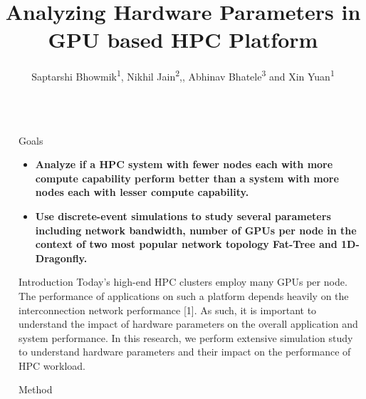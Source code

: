 \documentclass[final]{beamer}
\title{
  {Analyzing Hardware Parameters in GPU based HPC Platform}}
\author{Saptarshi Bhowmik\textsuperscript{1}, Nikhil Jain\textsuperscript{2},, Abhinav Bhatele\textsuperscript{3} and Xin Yuan\textsuperscript{1}} %
\institute{1. Florida State University, 2. NVIDIA, Inc, 3. University of Maryland}
\newlength{\sepwidth}
\newcommand{\separatorcolumn}{\begin{column}{\sepwidth}\end{column}}
\begin{document}
\begin{frame}[t]
\begin{columns}[t]
\separatorcolumn

\begin{column}{0.2\textwidth}

\begin{alertblock}{Goals}
    \begin{itemize}
        \item \textbf{ Analyze if a HPC system with fewer nodes each with more compute capability perform better than a system with more nodes each with lesser compute capability.}
        \item \textbf{ Use discrete-event simulations to study several parameters including network bandwidth, number of GPUs per node  in the context of two most popular network topology Fat-Tree and  1D-Dragonfly.}
    \end{itemize}
\end{alertblock}



  \begin{block}{Introduction}
    Today's high-end HPC clusters employ many GPUs per node. The performance of applications on such a platform depends heavily on the interconnection network performance [1]. As such, it is important to understand the impact of hardware parameters on the overall application and system performance. In this research, we perform extensive simulation study to understand hardware parameters and their impact on the performance of HPC workload.
    
    
  \end{block}

  \begin{block}{Method}
  
    \begin{itemize}
    

\end{itemize}
\end{block}
\end{column}
\end{columns}
\end{frame}
\end{document}
